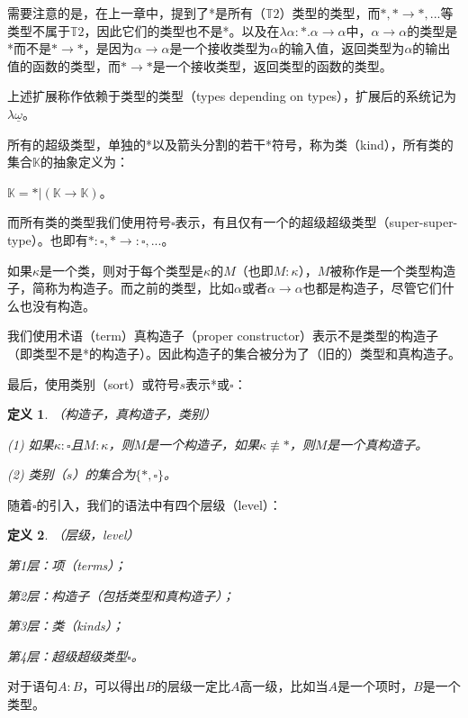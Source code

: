 \documentclass[UTF8]{article}
\newtheorem{thm}{定义}[section]
\begin{document}
		需要注意的是，在上一章中，提到了*是所有（$\mathbb{T}2$）类型的类型，而$*,*\rightarrow*,...$等类型不属于$\mathbb{T}2$，因此它们的类型也不是*。以及在$\lambda\alpha:*.\alpha\rightarrow\alpha$中，$\alpha\rightarrow\alpha$的类型是*而不是$*\rightarrow*$，是因为$\alpha\rightarrow\alpha$是一个接收类型为$\alpha$的输入值，返回类型为$\alpha$的输出值的函数的类型，而$*\rightarrow*$是一个接收类型，返回类型的函数的类型。
		
		上述扩展称作依赖于类型的类型（types depending on types），扩展后的系统记为$\lambda{\underline{\omega}}$。
			
		所有的超级类型，单独的*以及箭头分割的若干*符号，称为类（kind），所有类的集合$\mathbb{K}$的抽象定义为：
		
		$\mathbb{K}=*|(\mathbb{K}\rightarrow\mathbb{K})$。
		
		而所有类的类型我们使用符号$\square$表示，有且仅有一个的超级超级类型（super-super-type）。也即有$*:\square,*\rightarrow:\square,...$。
		
		如果$\kappa$是一个类，则对于每个类型是$\kappa$的$M$（也即$M:\kappa$），$M$被称作是一个类型构造子，简称为构造子。而之前的类型，比如$\alpha$或者$\alpha\rightarrow\alpha$也都是构造子，尽管它们什么也没有构造。
		
		我们使用术语（term）真构造子（proper constructor）表示不是类型的构造子（即类型不是*的构造子）。因此构造子的集合被分为了（旧的）类型和真构造子。
		
		最后，使用类别（sort）或符号$s$表示*或$\square$：
		
		\begin{thm}（构造子，真构造子，类别）
			
			(1) 如果$\kappa:\square$且$M:\kappa$，则$M$是一个构造子，如果$\kappa\not\equiv*$，则$M$是一个真构造子。
			
			(2) 类别（$s$）的集合为$\{*,\square\}$。
		\end{thm}
	
		随着$\square$的引入，我们的语法中有四个层级（level）：
		
		\begin{thm}（层级，level）
			
			第1层：项（terms）；
			
			第2层：构造子（包括类型和真构造子）；
			
			第3层：类（kinds）；
			
			第4层：超级超级类型$\square$。
		\end{thm}
	
		对于语句$A:B$，可以得出$B$的层级一定比$A$高一级，比如当$A$是一个项时，$B$是一个类型。
			
\end{document}
